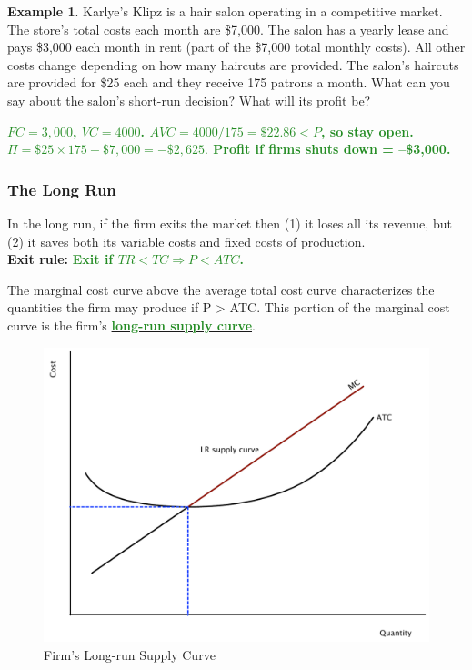 \documentclass[11pt]{article}\usepackage[]{graphicx}\usepackage[]{color}
\theoremstyle{definition}
\newtheorem{exmp}{Example}[section]
\newcommand{\blank}[1]{}
\newcommand{\ddp}[1]{{\textbf{\textcolor{ForestGreen}{#1}}}}
\newcommand{\dd}[1]{{\underline{\textbf{\textcolor{ForestGreen}{#1}}}}}
\newcommand{\defn}[1]{\textbf{#1}}
\begin{document}
	\begin{exmp} 
		Karlye's Klipz is a hair salon operating in a competitive market. The store's total costs each month are \$7,000. The salon has a yearly lease and pays \$3,000 each month in rent (part of the \$7,000 total monthly costs). All other costs change depending on how many haircuts are provided. The salon's haircuts are provided for \$25 each and they receive 175 patrons a month. What can you say about the salon's short-run decision? What will its profit be?
	\end{exmp}
	\ddp{$FC = 3,000$, $VC = 4000$. $AVC = 4000/175 = \$22.86 < P$, so stay open. $\Pi = \$25 \times 175 - \$7,000 = -\$2,625.$ Profit if firms shuts down = --\$3,000.}
	\blank{}
	
	\subsubsection*{The Long Run}
	
	In the long run, if the firm exits the market then (1) it loses all its revenue, but (2) it saves both its variable costs and fixed costs of production. 
	\\
	
	\defn{Exit rule:} \ddp{Exit if $TR < TC \Rightarrow P < ATC$. \\}
	
	The marginal cost curve above the average total cost curve characterizes the quantities the firm may produce if P > ATC. This portion of the marginal cost curve is the firm's \dd{long-run supply curve}.
	
	\begin{figure}[H]
		\centering
		\includegraphics[scale=.40]{plot65.pdf}
		\caption{Firm's Long-run Supply Curve}
	\end{figure}
	
\end{document}
